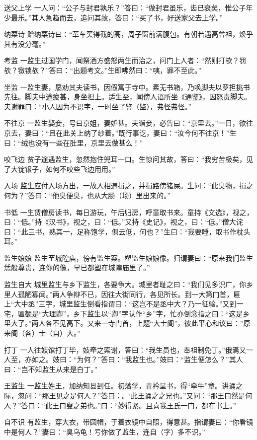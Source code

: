 \documentclass[12pt,UTF8]{ctexbook}
\begin{document}
送父上学
一人问：“公子与封君孰乐？”答曰：“做封君虽乐，齿已衰矣，惟公子年少最乐。”其人急趋而去，追问其故，答曰：“买了书，好送家父去上学。”

纳粟诗
赠纳粟诗曰：“革车买得截的高，周子窗前满腹包。有朝若遇高曾祖，焕乎其有没分毫。”

考监
一监生过国学门，闻祭酒方盛怒两生而治之，问门上人者：“然则打欤？罚欤？镦锁欤？”答曰：“出题考文。”生即咈然曰：“咦，罪不至此。”

坐监
一监生妻，屡劝其夫读书，因假寓于寺中。素无书箱，乃唤脚夫以罗担挑书先往。脚夫中途疲甚，身坐担上。适生至，闻傍人语所坐《通鉴》，因怒责脚夫。夫谢罪曰：“小人因为不识字，一时坐了鉴（监），弗怪弗怪。”

不往京
一监生娶妾，号曰京姐，妻妒甚。夫诣妾，必告曰：“京里去。”一日，欲往京去，妻曰：“且在此关上纳了纱着。”既行事讫，妻曰：“汝今何不往京！”生曰：“绒也没有一些在肚里，京里去做甚么！”

咬飞边
贫子途遇监生，忽然抱住兜耳一口。生惊问其故，答曰：“我穷苦极矣，见了大锭银子，如何不咬些飞边用用。”

入场
监生应付入场方出，一故人相遇揖之，并揖路傍猪屎。生问：“此臭物，揖之何为？”答曰：“他臭便臭，也从大肠（场）里出来的。”

书低
一生赁僧房读书，每日游玩，午后归房，呼童取书来。童持《文选》，视之，曰：“低。”持《汉书》，视之，曰：“低。”又持《史记》，视之，曰：“低。”僧大诧曰：“此三书，熟其一，足称饱学，俱云低，何也？”生曰：“我要睡，取书作枕头耳。”

监生娘娘
监生至城隍庙，傍有监生案。塑监生娘娘像。归谓妻曰：“原来我们监生恁般尊贵，连你的像，早已都塑在城隍庙里了。”

监生自大
城里监生与乡下监生，各要争大。城里者耻之曰：“我们见多识广，你乡里人孤陋寡闻。”两人争辩不已，因往大街同行，各见所长。到一大第门首，匾上“大中丞”三字，城里监生倒看指谓曰：“这岂不是丞中大？乃一征验。”又到一宅，匾额是“大理卿”，乡下监生以“卿”字认作“乡”字，忙亦倒念指之曰：“这是乡里大了。”两人各不见高下。又来一寺门首，上题“大士阁”，彼此平心和议曰：”原来阁（各）士（自）大。”

打丁
一人往妓馆打丁毕，妓牵之索谢，答曰：“我生员也，奉祖制免丁。”俄焉又一人至，亦如之。妓曰：“为何？”答曰：“我监生也。”妓曰：“监生便怎么？”其人曰：“岂不知监生从来是白丁。”

王监生
一监生姓王，加纳知县到任。初落学，青衿呈书，得“牵牛”章。讲诵之际，忽问：“那王见之是何人？”答曰：。‘此王诵之之兄也。”又问：“那王曰然是何人？”答曰：“此王曰叟之弟也。”曰：“妙得紧。且喜我王氏一门，都在书上。”

自不识
有监生，穿大衣，带圆帽，于着衣镜中自照，得意甚。指谓妻曰：“你看镜中是何人？”妻曰：“臭乌龟！亏你做了监生，连自（字）多不识。”
\end{document}
